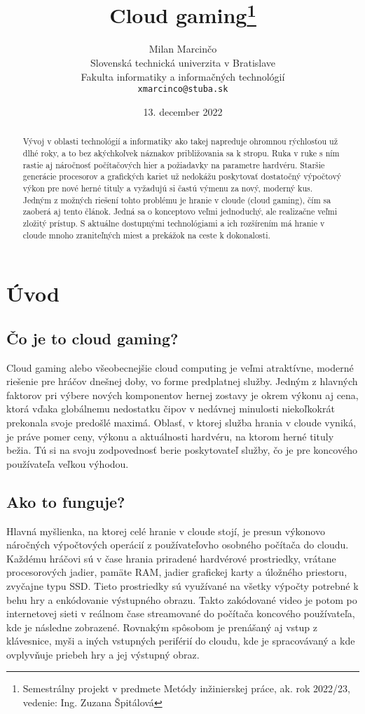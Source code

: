 \documentclass[10pt,twoside,slovak,a4paper]{article}
\title{Cloud gaming\thanks{Semestrálny projekt v predmete Metódy inžinierskej práce, ak. rok 2022/23, vedenie: Ing. Zuzana Špitálová}}
\author{Milan Marcinčo\\[2pt]
	{\small Slovenská technická univerzita v Bratislave}\\
	{\small Fakulta informatiky a informačných technológií}\\
	{\small \texttt{xmarcinco@stuba.sk}}
	}
\date{\small 13. december 2022}
\begin{document}
\maketitle

\begin{abstract}
Vývoj v oblasti technológií a informatiky ako takej napreduje ohromnou rýchlosťou už dlhé roky, a to bez akýchkoľvek náznakov približovania sa k stropu. Ruka v ruke s ním rastie aj náročnosť počítačových hier a požiadavky na parametre hardvéru. Staršie generácie procesorov a grafických kariet už nedokážu poskytovať dostatočný výpočtový výkon pre nové herné tituly a vyžadujú si častú výmenu za nový, moderný kus. Jedným z možných riešení tohto problému je hranie v cloude (cloud gaming), čím sa zaoberá aj tento článok. Jedná sa o konceptovo veľmi jednoduchý, ale realizačne veľmi zložitý prístup. S aktuálne dostupnými technológiami a ich rozšírením má hranie v cloude mnoho zraniteľných miest a prekážok na ceste k dokonalosti.
\end{abstract}



\section{Úvod}

\subsection{Čo je to cloud gaming?}

Cloud gaming alebo všeobecnejšie cloud computing je veľmi atraktívne, moderné riešenie pre hráčov dnešnej doby, vo forme predplatnej služby. Jedným z hlavných faktorov pri výbere nových komponentov hernej zostavy je okrem výkonu aj cena, ktorá vďaka globálnemu nedostatku čipov v nedávnej minulosti niekoľkokrát prekonala svoje predošlé maximá. Oblasť, v ktorej služba hrania v cloude vyniká, je práve pomer ceny, výkonu a aktuálnosti hardvéru, na ktorom herné tituly bežia. Tú si na svoju zodpovednosť berie poskytovateľ služby, čo je pre koncového používateľa veľkou výhodou.



\subsection{Ako to funguje?}

Hlavná myšlienka, na ktorej celé hranie v cloude stojí, je presun výkonovo náročných výpočtových operácií z používateľovho osobného počítača do cloudu. Každému hráčovi sú v čase hrania priradené hardvérové prostriedky, vrátane procesorových jadier, pamäte RAM, jadier grafickej karty a úložného priestoru, zvyčajne typu SSD. Tieto prostriedky sú využívané na všetky výpočty potrebné k behu hry a enkódovanie výstupného obrazu. Takto zakódované video je potom po internetovej sieti v reálnom čase streamované do počítača koncového používateľa, kde je následne zobrazené. Rovnakým spôsobom je prenášaný aj vstup z klávesnice, myši a iných vstupných periférií do cloudu, kde je spracovávaný a kde ovplyvňuje priebeh hry a jej výstupný obraz.
\end{document}

